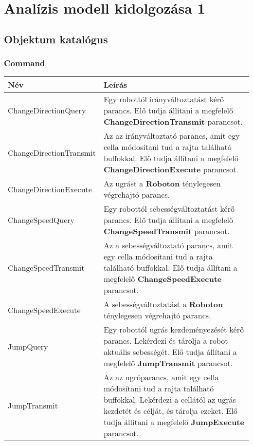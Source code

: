 %
\chapter{Analízis modell kidolgozása 1}

\thispagestyle{fancy}

\section{Objektum katalógus}

\subsection{Command}
\begin{tabularx}{\linewidth}{| l | X |}
\hline
\textbf{Név} & \textbf{Leírás} \tabularnewline
\hline\hline
\endhead
ChangeDirectionQuery & Egy robottól irányváltoztatást kérő parancs. Elő tudja állítani a megfelelő \textbf{ChangeDirectionTransmit} parancsot. \tabularnewline\hline

ChangeDirectionTransmit & Az az irányváltoztató parancs, amit egy cella módosítani tud a rajta található buffokkal. Elő tudja állítani a megfelelő \textbf{ChangeDirectionExecute} parancsot. \tabularnewline\hline 

ChangeDirectionExecute & Az ugrást a \textbf{Roboton} ténylegesen végrehajtó parancs. \tabularnewline\hline

ChangeSpeedQuery & Egy robottól sebességváltoztatást kérő parancs. Elő tudja állítani a megfelelő \textbf{ChangeSpeedTransmit} parancsot. \tabularnewline\hline

ChangeSpeedTransmit & Az a sebességváltoztató parancs, amit egy cella módosítani tud a rajta található buffokkal. Elő tudja állítani a megfelelő \textbf{ChangeSpeedExecute} parancsot. \tabularnewline\hline

ChangeSpeedExecute & A sebességváltoztatást a \textbf{Roboton} ténylegesen végrehajtó parancs. \tabularnewline\hline

JumpQuery & Egy robottól ugrás kezdeményezését kérő parancs. Lekérdezi és tárolja a robot aktuális sebességét. Elő tudja állítani a megfelelő \textbf{JumpTransmit} parancsot.  \tabularnewline\hline

JumpTransmit & Az az ugróparancs, amit egy cella módosítani tud a rajta található buffokkal. Lekérdezi a cellától az ugrás kezdetét és célját, és tárolja ezeket. Elő tudja állítani a megfelelő \textbf{JumpExecute} parancsot. \tabularnewline\hline 


\end{tabularx}
